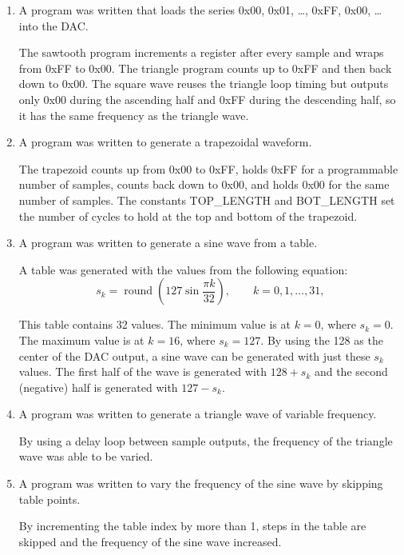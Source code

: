 \documentclass[11pt]{article}
\begin{document}
\begin{enumerate}
\item A program was written that loads the series 0x00, 0x01, \ldots, 0xFF, 0x00, \ldots{} into the DAC. 

The sawtooth program increments a register after every sample and wraps from 0xFF to 0x00. The triangle program counts up to 0xFF and then back down to 0x00. The square wave reuses the triangle loop timing but outputs only 0x00 during the ascending half and 0xFF during the descending half, so it has the same frequency as the triangle wave.

\item A program was written to generate a trapezoidal waveform.

The trapezoid counts up from 0x00 to 0xFF, holds 0xFF for a programmable number of samples, counts back down to 0x00, and holds 0x00 for the same number of samples. The constants TOP\_LENGTH and BOT\_LENGTH set the number of cycles to hold at the top and bottom of the trapezoid. 

\item A program was written to generate a sine wave from a table.

A table was generated with the values from the following equation:
\begin{equation}
  s_k = \operatorname{round}\!\left(127 \sin\frac{\pi k}{32}\right), \qquad k = 0, 1, \ldots, 31,
\end{equation}

This table contains 32 values. The minimum value is at $k=0$, where ${s_k = 0}$. The maximum value is at $k=16$, where $s_k = 127$. By using the 128 as the center of the DAC output, a sine wave can be generated with just these $s_k$ values. The first half of the wave is generated with $128+s_k$ and the second (negative) half is generated with $127-s_k$.

\item A program was written to generate a triangle wave of variable frequency.

By using a delay loop between sample outputs, the frequency of the triangle wave was able to be varied.

\item A program was written to vary the frequency of the sine wave by skipping table points.

By incrementing the table index by more than 1, steps in the table are skipped and the frequency of the sine wave increased.
\end{enumerate}
\end{document}
